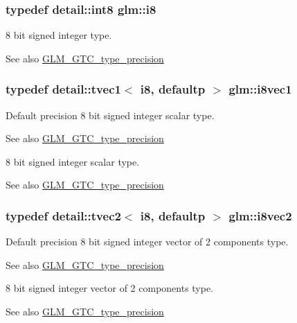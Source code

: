 \subsubsection[{\texorpdfstring{i8}{i8}}]{\setlength{\rightskip}{0pt plus 5cm}typedef detail\+::int8 {\bf glm\+::i8}}\hypertarget{group__gtc__type__precision_gaae064be68b7d36cd7910c16e8ad18bba}{}\label{group__gtc__type__precision_gaae064be68b7d36cd7910c16e8ad18bba}
8 bit signed integer type. \begin{DoxySeeAlso}{See also}
\hyperlink{group__gtc__type__precision}{G\+L\+M\+\_\+\+G\+T\+C\+\_\+type\+\_\+precision} 
\end{DoxySeeAlso}
\subsubsection[{\texorpdfstring{i8vec1}{i8vec1}}]{\setlength{\rightskip}{0pt plus 5cm}typedef detail\+::tvec1$<$ i8, defaultp $>$ {\bf glm\+::i8vec1}}\hypertarget{group__gtc__type__precision_gae67d2e1e7ebd1a79176cac554395b881}{}\label{group__gtc__type__precision_gae67d2e1e7ebd1a79176cac554395b881}
Default precision 8 bit signed integer scalar type. \begin{DoxySeeAlso}{See also}
\hyperlink{group__gtc__type__precision}{G\+L\+M\+\_\+\+G\+T\+C\+\_\+type\+\_\+precision}
\end{DoxySeeAlso}
8 bit signed integer scalar type. \begin{DoxySeeAlso}{See also}
\hyperlink{group__gtc__type__precision}{G\+L\+M\+\_\+\+G\+T\+C\+\_\+type\+\_\+precision} 
\end{DoxySeeAlso}
\subsubsection[{\texorpdfstring{i8vec2}{i8vec2}}]{\setlength{\rightskip}{0pt plus 5cm}typedef detail\+::tvec2$<$ i8, defaultp $>$ {\bf glm\+::i8vec2}}\hypertarget{group__gtc__type__precision_gafd7bbd3878c298014276975f999a8677}{}\label{group__gtc__type__precision_gafd7bbd3878c298014276975f999a8677}
Default precision 8 bit signed integer vector of 2 components type. \begin{DoxySeeAlso}{See also}
\hyperlink{group__gtc__type__precision}{G\+L\+M\+\_\+\+G\+T\+C\+\_\+type\+\_\+precision}
\end{DoxySeeAlso}
8 bit signed integer vector of 2 components type. \begin{DoxySeeAlso}{See also}
\hyperlink{group__gtc__type__precision}{G\+L\+M\+\_\+\+G\+T\+C\+\_\+type\+\_\+precision} 
\end{DoxySeeAlso}
